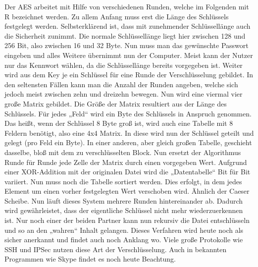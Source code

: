 Der AES arbeitet mit Hilfe von verschiedenen Runden, welche im Folgenden mit R bezeichnet werden. Zu allem Anfang muss erst die Länge des Schlüssels festgelegt werden. Selbsterklärend ist, dass mit zunehmender Schlüssellänge auch die Sicherheit zunimmt. Die normale Schlüssellänge liegt hier zwischen 128 und 256 Bit, also zwischen 16 und 32 Byte. Nun muss man das gewünschte Passwort eingeben und alles Weitere übernimmt nun der Computer. Meist kann der Nutzer nur das Kennwort wählen, da die Schlüssellänge bereits vorgegeben ist. Weiter wird aus dem Key je ein Schlüssel für eine Runde der Verschlüsselung gebildet. In den seltensten Fällen kann man die Anzahl der Runden angeben, welche sich jedoch meist zwischen zehn und dreizehn bewegen. Nun wird eine viermal vier große Matrix gebildet. Die Größe der Matrix resultiert aus der Länge des Schlüssels. Für jedes „Feld“ wird ein Byte des Schlüssels in Anspruch genommen. Das heißt, wenn der Schlüssel 8 Byte groß ist, wird auch eine Tabelle mit 8 Feldern benötigt, also eine 4x4 Matrix. In diese wird nun der Schlüssel geteilt und gelegt (pro Feld ein Byte). In einer anderen, aber gleich großen Tabelle, geschieht dasselbe, bloß mit dem zu verschlüsselten Block. Nun ersetzt der Algorithmus Runde für Runde jede Zelle der Matrix durch einen vorgegeben Wert. Aufgrund einer XOR-Addition mit der originalen Datei wird die „Datentabelle“ Bit für Bit variiert. Nun muss noch die Tabelle sortiert werden. Dies erfolgt, in dem jedes Element um einen vorher festgelegten Wert verschoben wird. Ähnlich der Caeser Scheibe. Nun läuft dieses System mehrere Runden hintereinander ab. Dadurch wird gewährleistet, dass der eigentliche Schlüssel nicht mehr wiederzuerkennen ist. Nur noch einer der beiden Partner kann nun rekursiv die Datei entschlüsseln und so an den „wahren“ Inhalt gelangen. Dieses Verfahren wird heute noch als sicher anerkannt und findet auch noch Anklang wo. Viele große Protokolle wie SSH und IPSec nutzen diese Art der Verschlüsselung. Auch in bekannten Programmen wie Skype findet es noch heute Beachtung. \cite{mathe1} \\

